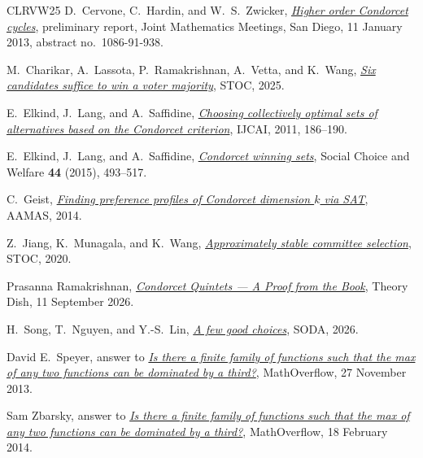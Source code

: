 \documentclass[11pt,letterpaper]{article}
\theoremstyle{cleanthm}
\begin{document}
\begin{thebibliography}{CLRVW25}\small\setlength{\itemsep}{2pt}
D.~Cervone, C.~Hardin, and W.~S.~Zwicker,
\href{https://jointmathematicsmeetings.org/1086_san_diego_prog.pdf\#page=83}{\emph{Higher order Condorcet cycles}}, preliminary report, Joint Mathematics Meetings, San Diego, 11 January 2013, abstract no.~1086-91-938.

M.~Charikar, A.~Lassota, P.~Ramakrishnan, A.~Vetta, and K.~Wang,
\href{https://arxiv.org/html/2411.03390v4}{\emph{Six candidates suffice to win a voter majority}}, STOC, 2025.

E.~Elkind, J.~Lang, and A.~Saffidine,
\href{https://ijcai.org/proceedings/2011/42}{\emph{Choosing collectively optimal sets of alternatives based on the Condorcet criterion}}, IJCAI, 2011, 186--190.

E.~Elkind, J.~Lang, and A.~Saffidine,
\href{https://www.lamsade.dauphine.fr/~lang/papers/els15.pdf}{\emph{Condorcet winning sets}}, Social Choice and Welfare \textbf{44} (2015), 493--517.

C.~Geist, \href{https://arxiv.org/abs/1402.4303}{\emph{Finding preference profiles of Condorcet
dimension \(k\) via SAT}}, AAMAS, 2014.

Z.~Jiang, K.~Munagala, and K.~Wang,
\href{https://doi.org/10.1145/3357713.3384238}{\emph{Approximately stable committee selection}}, STOC, 2020.

Prasanna Ramakrishnan,
\href{https://theorydish.blog/2026/09/11/condorcet-quintets-a-proof-from-the-book/}{\emph{Condorcet Quintets --- A Proof from the Book}},
Theory Dish, 11 September 2026.

H.~Song, T.~Nguyen, and Y.-S.~Lin,
\href{https://doi.org/10.1137/1.9781611978971.175}{\emph{A few good choices}}, SODA, 2026.

David E.~Speyer, answer to
\href{https://mathoverflow.net/questions/148466/is-there-a-finite-family-of-functions-such-that-the-max-of-any-two-functions-can/150141\#150141}{\emph{Is there a finite family of functions such that the max of any two functions can be dominated by a third?}},
MathOverflow, 27 November 2013.

Sam Zbarsky, answer to
\href{https://mathoverflow.net/questions/148466/is-there-a-finite-family-of-functions-such-that-the-max-of-any-two-functions-can/157982\#157982}{\emph{Is there a finite family of functions such that the max of any two functions can be dominated by a third?}},
MathOverflow, 18 February 2014.

\end{thebibliography}
\end{document}
